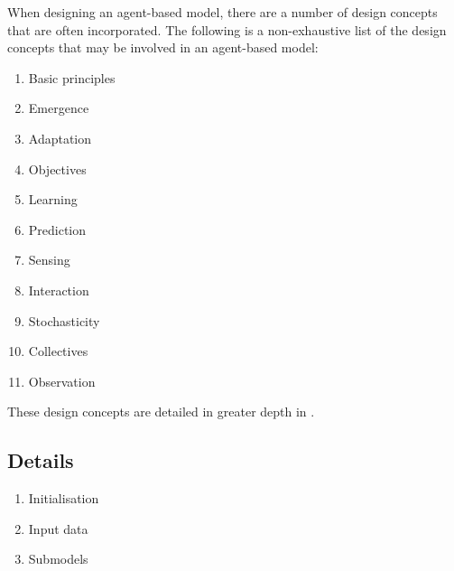 When designing an agent-based model, there are a number of design concepts that
are often incorporated.
The following is a non-exhaustive list of the design concepts that may be
involved in an agent-based model:
\begin{enumerate}
    \item Basic principles
    \item Emergence
    \item Adaptation
    \item Objectives
    \item Learning
    \item Prediction
    \item Sensing
    \item Interaction
    \item Stochasticity
    \item Collectives
    \item Observation
\end{enumerate}
These design concepts are detailed in greater depth in \cite{grimm2010odd}.

\subsection{Details}
\label{sub:odd:details}

\begin{enumerate}
    \item Initialisation
    \item Input data
    \item Submodels
\end{enumerate}


